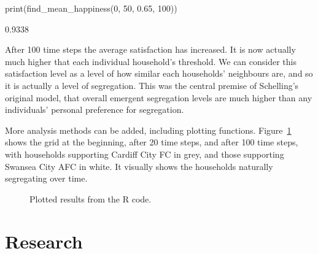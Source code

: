 \begin{Rin}
print(find_mean_happiness(0, 50, 0.65, 100))
\end{Rin}

\begin{Rout}
[1] 0.9338
\end{Rout}

After 100 time steps the average satisfaction has increased.
It is now actually much higher that each individual household's threshold.
We can consider this satisfaction level as a level of how similar each
households' neighbours are, and so it is actually a level of segregation.
This was the central premise of Schelling's original model, that overall
emergent segregation levels are much higher than any individuals' personal
preference for segregation.

More analysis methods can be added, including plotting functions.
Figure~\ref{fig:schelling_R_plot} shows the grid at the beginning, after 20
time steps, and after 100 time steps, with households supporting Cardiff City FC
in grey, and those supporting Swansea City AFC in white.
It visually shows the households naturally segregating over time.

\begin{figure}
\begin{center}
\end{center}
\caption{Plotted results from the R code.}
\label{fig:schelling_R_plot}
\end{figure}

\section{Research}\label{sec:research}
